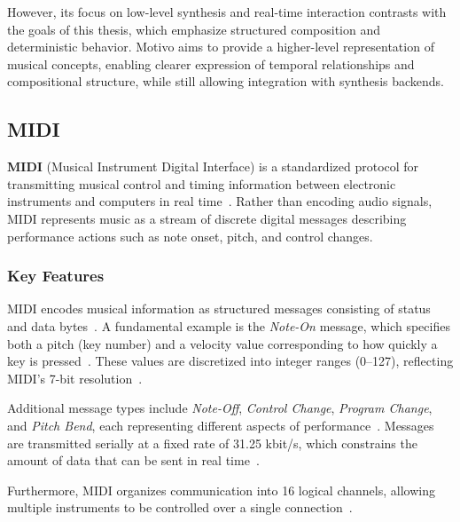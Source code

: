 However, its focus on low-level synthesis and real-time interaction contrasts with the goals of this thesis,
which emphasize structured composition and deterministic behavior.
Motivo aims to provide a higher-level representation of musical concepts, enabling clearer expression of
temporal relationships and compositional structure, while still allowing integration with synthesis backends.


\subsection{MIDI}\label{detail-subsec:midi}

\textbf{MIDI} (Musical Instrument Digital Interface) is a standardized protocol for transmitting musical control and
timing information between electronic instruments and computers in real time~\cite{Moog_1986}.
Rather than encoding audio signals, MIDI represents music as a stream of discrete digital messages describing
performance actions such as note onset, pitch, and control changes.


\subsubsection{Key Features}

MIDI encodes musical information as structured messages consisting of status and data bytes~\cite{Moog_1986}.
A fundamental example is the \textit{Note-On} message, which specifies both a pitch (key number) and a velocity value
corresponding to how quickly a key is pressed~\cite{Moog_1986}.
These values are discretized into integer ranges (0--127), reflecting MIDI’s 7-bit resolution~\cite{Moog_1986}.

Additional message types include \textit{Note-Off}, \textit{Control Change}, \textit{Program Change}, and
\textit{Pitch Bend}, each representing different aspects of performance~\cite{Moog_1986}.
Messages are transmitted serially at a fixed rate of 31.25 kbit/s, which constrains the amount of data that can be sent
in real time~\cite{Moog_1986}.

Furthermore, MIDI organizes communication into 16 logical channels, allowing multiple instruments to be controlled over
a single connection~\cite{Moog_1986}.

